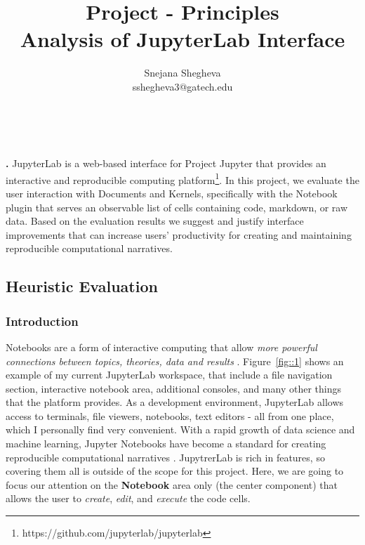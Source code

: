 \documentclass[12pt,letterpaper]{article}
\makeatletter
\renewcommand{\maketitle}{\bgroup
   \begin{center}
   \textbf{{\fontsize{18pt}{20}\selectfont \@title}}\\
   \vspace{10pt}
   {\fontsize{12pt}{0}\selectfont \@author} 
   \end{center}
}
\newenvironment{myquote}[1]%
  {\list{}{\leftmargin=#1\rightmargin=#1}\item[]}%
  {\endlist}
\renewenvironment{abstract}
{\vspace*{-.5in}\fontsize{12pt}{12}\begin{myquote}{.5in}
\noindent \par{\bfseries \abstractname.}}
{\medskip\noindent
\end{myquote}
}
\makeatother
\begin{document}
\title{Project - Principles\\Analysis of JupyterLab Interface}
\author{Snejana Shegheva \\ sshegheva3@gatech.edu}

\maketitle
\thispagestyle{fancy}

\begin{abstract}
JupyterLab is a web-based interface for Project Jupyter that provides an interactive and reproducible computing platform\footnote{https://github.com/jupyterlab/jupyterlab}. In this project, we evaluate the user interaction with Documents and Kernels, specifically with the Notebook plugin that serves an observable list of cells containing code, markdown, or raw data. Based on the evaluation results we suggest and justify interface improvements that can increase users' productivity for creating and maintaining reproducible computational narratives.
\end{abstract}

\subsection*{Heuristic Evaluation}

\subsubsection*{Introduction}

Notebooks are a form of interactive computing that allow \textit{more powerful connections between topics, theories, data and results} \cite{perkel2018jupyter}. Figure~\ref{fig::1} shows an example of my current JupyterLab workspace, that include a file navigation section, interactive notebook area, additional consoles, and many other things that the platform provides. As a development environment, JupyterLab allows access to terminals, file viewers, notebooks, text editors - all from one place, which I personally find very convenient. With a rapid growth of data science and machine learning, Jupyter Notebooks have become a standard for creating reproducible computational narratives \cite{perkel2018jupyter}. JupytrerLab is rich in features, so covering them all is outside of the scope for this project. Here, we are going to focus our attention on the \textbf{Notebook} area only (the center component) that allows the user to \textit{create}, \textit{edit}, and \textit{execute} the code cells.  
\end{document}
